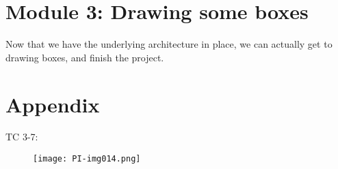 \documentclass{article}
\begin{document}
\bigskip


\bigskip


\bigskip

\section{Module 3: Drawing some boxes}

\bigskip

Now that we have the underlying architecture in place, we can actually get to drawing boxes, and finish the project.


\bigskip


\bigskip


\bigskip


\bigskip


\bigskip


\bigskip

\section{Appendix}

\bigskip

TC 3-7:


\begin{figure}
\texttt{[image: PI-img014.png]}\end{figure}
\end{document}
